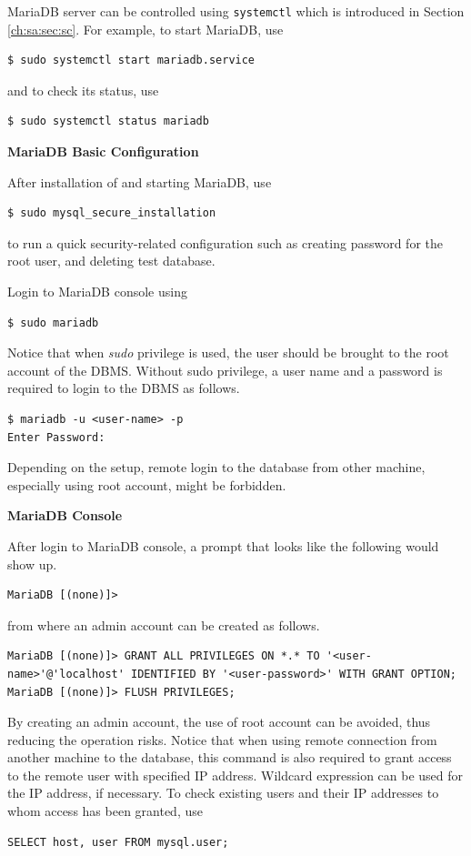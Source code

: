 MariaDB server can be controlled using \verb|systemctl| which is introduced in Section \ref{ch:sa:sec:sc}. For example, to start MariaDB, use
\begin{lstlisting}
$ sudo systemctl start mariadb.service
\end{lstlisting}
and to check its status, use
\begin{lstlisting}
$ sudo systemctl status mariadb
\end{lstlisting}

\vspace{0.1in}
\noindent \textbf{MariaDB Basic Configuration}
\vspace{0.1in}

After installation of and starting MariaDB, use
\begin{lstlisting}
$ sudo mysql_secure_installation
\end{lstlisting}
to run a quick security-related configuration such as creating password for the root user, and deleting test database.

Login to MariaDB console using
\begin{lstlisting}
$ sudo mariadb
\end{lstlisting}
Notice that when \textit{sudo} privilege is used, the user should be brought to the root account of the DBMS. Without sudo privilege, a user name and a password is required to login to the DBMS as follows.
\begin{lstlisting}
$ mariadb -u <user-name> -p
Enter Password:
\end{lstlisting}
Depending on the setup, remote login to the database from other machine, especially using root account, might be forbidden.

\vspace{0.1in}
\noindent \textbf{MariaDB Console}
\vspace{0.1in}

After login to MariaDB console, a prompt that looks like the following would show up.
\begin{lstlisting}
MariaDB [(none)]>
\end{lstlisting}
from where an admin account can be created as follows.
\begin{lstlisting}
MariaDB [(none)]> GRANT ALL PRIVILEGES ON *.* TO '<user-name>'@'localhost' IDENTIFIED BY '<user-password>' WITH GRANT OPTION;
MariaDB [(none)]> FLUSH PRIVILEGES;
\end{lstlisting}
By creating an admin account, the use of root account can be avoided, thus reducing the operation risks. Notice that when using remote connection from another machine to the database, this command is also required to grant access to the remote user with specified IP address. Wildcard expression can be used for the IP address, if necessary. To check existing users and their IP addresses to whom access has been granted, use
\begin{lstlisting}
SELECT host, user FROM mysql.user;
\end{lstlisting}


